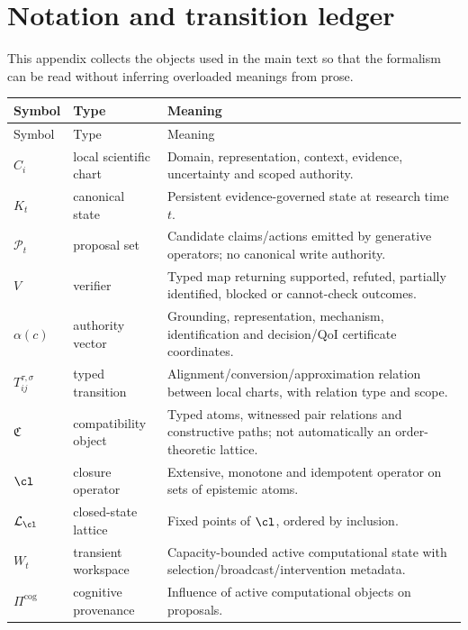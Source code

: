 \appendix

\section{Notation and transition ledger}

This appendix collects the objects used in the main text so that the formalism can be read without inferring overloaded meanings from prose.

\begin{longtable}{>{\raggedright\arraybackslash}p{} >{\raggedright\arraybackslash}p{} >{\raggedright\arraybackslash}p{}}
\toprule
Symbol & Type & Meaning \\
\midrule
\endfirsthead
\toprule
Symbol & Type & Meaning \\
\midrule
\endhead
\(C_i\) & local scientific chart & Domain, representation, context, evidence, uncertainty and scoped authority. \\
\(K_t\) & canonical state & Persistent evidence-governed state at research time \(t\). \\
\(\mathcal P_t\) & proposal set & Candidate claims/actions emitted by generative operators; no canonical write authority. \\
\(V\) & verifier & Typed map returning supported, refuted, partially identified, blocked or cannot-check outcomes. \\
\(\alpha(c)\) & authority vector & Grounding, representation, mechanism, identification and decision/QoI certificate coordinates. \\
\(T_{ij}^{\tau,\sigma}\) & typed transition & Alignment/conversion/approximation relation between local charts, with relation type and scope. \\
\(\mathfrak C\) & compatibility object & Typed atoms, witnessed pair relations and constructive paths; not automatically an order-theoretic lattice. \\
\(\cl\) & closure operator & Extensive, monotone and idempotent operator on sets of epistemic atoms. \\
\(\mathcal L_{\cl}\) & closed-state lattice & Fixed points of \(\cl\), ordered by inclusion. \\
\(W_t\) & transient workspace & Capacity-bounded active computational state with selection/broadcast/intervention metadata. \\
\(\Pi^{\mathrm{cog}}\) & cognitive provenance & Influence of active computational objects on proposals. \\

\end{longtable}
